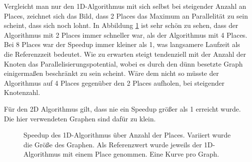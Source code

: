 Vergleicht man nur den 1D-Algorithmus mit sich selbst bei steigender Anzahl an Places, zeichnet sich das Bild, dass 2 Places das Maximum an Parallelität zu sein scheint, dass sich noch lohnt. In Abbildung \ref{fig:groesse_speedup} ist sehr schön zu sehen, dass der Algorithmus mit 2 Places immer schneller war, als der Algorithmus mit 4 Places. Bei 8 Places war der Speedup immer kleiner als 1, was langsamere Laufzeit als die Referenzzeit bedeutet. Wie zu erwarten steigt tendenziell mit der Anzahl der Knoten das Parallelisierungspotential, wobei es durch den dünn besetzte Graph einigermaßen beschränkt zu sein scheint. Wäre dem nicht so müsste der Algorithmus auf 4 Places gegenüber den 2 Places aufholen, bei steigender Knotenzahl.

Für den 2D Algorithmus gilt, dass nie ein Speedup größer als 1 erreicht wurde. Die hier verwendeten Graphen sind dafür zu klein.

\begin{figure}
	\centering
	\caption{Speedup des 1D-Algorithmus über Anzahl der Places. Variiert wurde die Größe des Graphen. Als Referenzwert wurde jeweils der 1D-Algorithmus mit einem Place genommen. Eine Kurve pro Graph.}
	\label{fig:groesse_speedup}
\end{figure}

